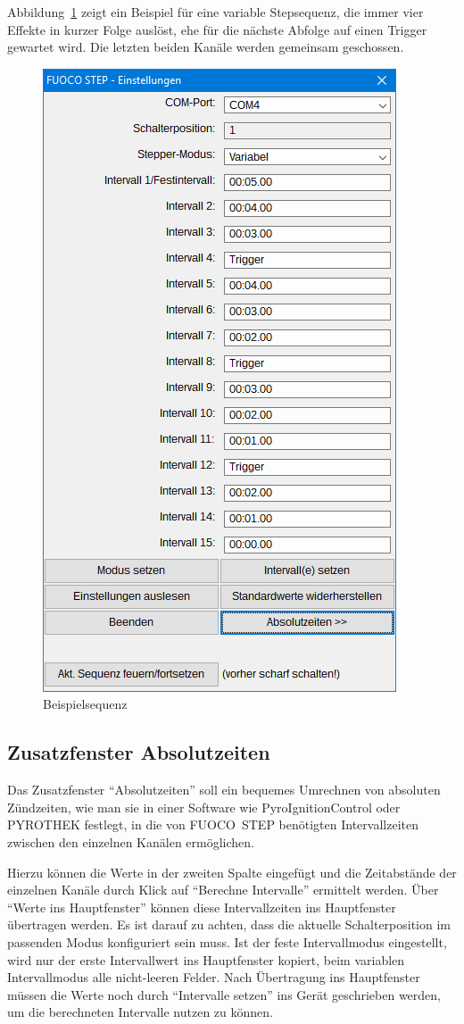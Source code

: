 \documentclass[paper=a4, open=any]{scrbook}
\begin{document}
				Abbildung~\ref{fig:beispielsequenz} zeigt ein Beispiel für eine variable Stepsequenz, die immer vier Effekte in kurzer Folge auslöst, ehe für die nächste Abfolge auf einen Trigger gewartet wird. Die letzten beiden Kanäle werden gemeinsam geschossen.
				
				\begin{figure}[tb]
					\centering\includegraphics[width=.5\textwidth]{beispielshow}
					\caption{Beispielsequenz}
					\label{fig:beispielsequenz}
				\end{figure}

			\subsection{Zusatzfenster Absolutzeiten}
			\label{sec:absolutzeiten}
				Das Zusatzfenster \enquote{Absolutzeiten} soll ein bequemes Umrechnen von absoluten Zündzeiten, wie man sie in einer Software wie PyroIgnitionControl oder PYROTHEK festlegt, in die von FUOCO~STEP benötigten Intervallzeiten zwischen den einzelnen Kanälen ermöglichen.
				
				Hierzu können die Werte in der zweiten Spalte eingefügt und die Zeitabstände der einzelnen Kanäle durch Klick auf \enquote{Berechne Intervalle} ermittelt werden. Über \enquote{Werte ins Hauptfenster} können diese Intervallzeiten ins Hauptfenster übertragen werden. Es ist darauf zu achten, dass die aktuelle Schalterposition im passenden Modus konfiguriert sein muss. Ist der feste Intervallmodus eingestellt, wird nur der erste Intervallwert ins Hauptfenster kopiert, beim variablen Intervallmodus alle nicht-leeren Felder. Nach Übertragung ins Hauptfenster müssen die Werte noch durch \enquote{Intervalle setzen} ins Gerät geschrieben werden, um die berechneten Intervalle nutzen zu können.
				
\end{document}

